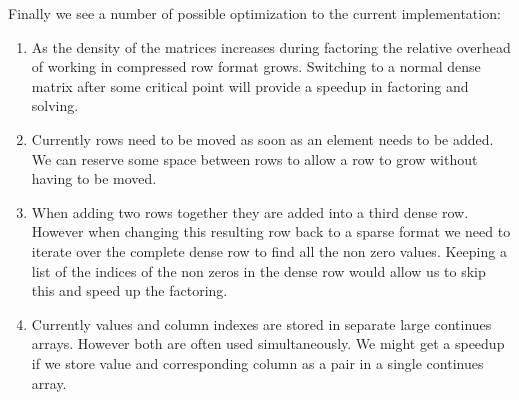 \documentclass[10pt]{article}
\begin{document}
Finally we see a number of possible optimization to the current implementation:
\begin{enumerate}
\item As the density of the matrices increases during factoring the relative overhead of working in compressed row format grows. Switching to a normal dense matrix after some critical point will provide a speedup in factoring and solving. 

\item Currently rows need to be moved as soon as an element needs to be added. We can reserve some space between rows to allow a row to grow without having to be moved. 

\item When adding two rows together they are added into a third dense row. However when changing this resulting row back to a sparse format we need to iterate over the complete dense row to find all the non zero values. Keeping a list of the indices of the non zeros in the dense row would allow us to skip this and speed up the factoring.

\item Currently values and column indexes are stored in separate large continues arrays. However both are often used simultaneously. We might get a speedup if we store value and corresponding column as a pair in a single continues array. 
\end{enumerate}

\clearpage


\end{document}
